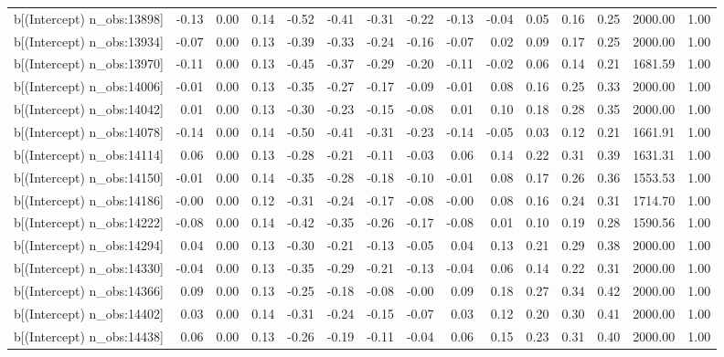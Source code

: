 \begin{table}[ht]
\begin{tabular}{rrrrrrrrrrrrrrr}
  b[(Intercept) n\_obs:13898] & -0.13 & 0.00 & 0.14 & -0.52 & -0.41 & -0.31 & -0.22 & -0.13 & -0.04 & 0.05 & 0.16 & 0.25 & 2000.00 & 1.00 \\ 
  b[(Intercept) n\_obs:13934] & -0.07 & 0.00 & 0.13 & -0.39 & -0.33 & -0.24 & -0.16 & -0.07 & 0.02 & 0.09 & 0.17 & 0.25 & 2000.00 & 1.00 \\ 
  b[(Intercept) n\_obs:13970] & -0.11 & 0.00 & 0.13 & -0.45 & -0.37 & -0.29 & -0.20 & -0.11 & -0.02 & 0.06 & 0.14 & 0.21 & 1681.59 & 1.00 \\ 
  b[(Intercept) n\_obs:14006] & -0.01 & 0.00 & 0.13 & -0.35 & -0.27 & -0.17 & -0.09 & -0.01 & 0.08 & 0.16 & 0.25 & 0.33 & 2000.00 & 1.00 \\ 
  b[(Intercept) n\_obs:14042] & 0.01 & 0.00 & 0.13 & -0.30 & -0.23 & -0.15 & -0.08 & 0.01 & 0.10 & 0.18 & 0.28 & 0.35 & 2000.00 & 1.00 \\ 
  b[(Intercept) n\_obs:14078] & -0.14 & 0.00 & 0.14 & -0.50 & -0.41 & -0.31 & -0.23 & -0.14 & -0.05 & 0.03 & 0.12 & 0.21 & 1661.91 & 1.00 \\ 
  b[(Intercept) n\_obs:14114] & 0.06 & 0.00 & 0.13 & -0.28 & -0.21 & -0.11 & -0.03 & 0.06 & 0.14 & 0.22 & 0.31 & 0.39 & 1631.31 & 1.00 \\ 
  b[(Intercept) n\_obs:14150] & -0.01 & 0.00 & 0.14 & -0.35 & -0.28 & -0.18 & -0.10 & -0.01 & 0.08 & 0.17 & 0.26 & 0.36 & 1553.53 & 1.00 \\ 
  b[(Intercept) n\_obs:14186] & -0.00 & 0.00 & 0.12 & -0.31 & -0.24 & -0.17 & -0.08 & -0.00 & 0.08 & 0.16 & 0.24 & 0.31 & 1714.70 & 1.00 \\ 
  b[(Intercept) n\_obs:14222] & -0.08 & 0.00 & 0.14 & -0.42 & -0.35 & -0.26 & -0.17 & -0.08 & 0.01 & 0.10 & 0.19 & 0.28 & 1590.56 & 1.00 \\ 
  b[(Intercept) n\_obs:14294] & 0.04 & 0.00 & 0.13 & -0.30 & -0.21 & -0.13 & -0.05 & 0.04 & 0.13 & 0.21 & 0.29 & 0.38 & 2000.00 & 1.00 \\ 
  b[(Intercept) n\_obs:14330] & -0.04 & 0.00 & 0.13 & -0.35 & -0.29 & -0.21 & -0.13 & -0.04 & 0.06 & 0.14 & 0.22 & 0.31 & 2000.00 & 1.00 \\ 
  b[(Intercept) n\_obs:14366] & 0.09 & 0.00 & 0.13 & -0.25 & -0.18 & -0.08 & -0.00 & 0.09 & 0.18 & 0.27 & 0.34 & 0.42 & 2000.00 & 1.00 \\ 
  b[(Intercept) n\_obs:14402] & 0.03 & 0.00 & 0.14 & -0.31 & -0.24 & -0.15 & -0.07 & 0.03 & 0.12 & 0.20 & 0.30 & 0.41 & 2000.00 & 1.00 \\ 
  b[(Intercept) n\_obs:14438] & 0.06 & 0.00 & 0.13 & -0.26 & -0.19 & -0.11 & -0.04 & 0.06 & 0.15 & 0.23 & 0.31 & 0.40 & 2000.00 & 1.00 \\ 

\end{tabular}
\end{table}
